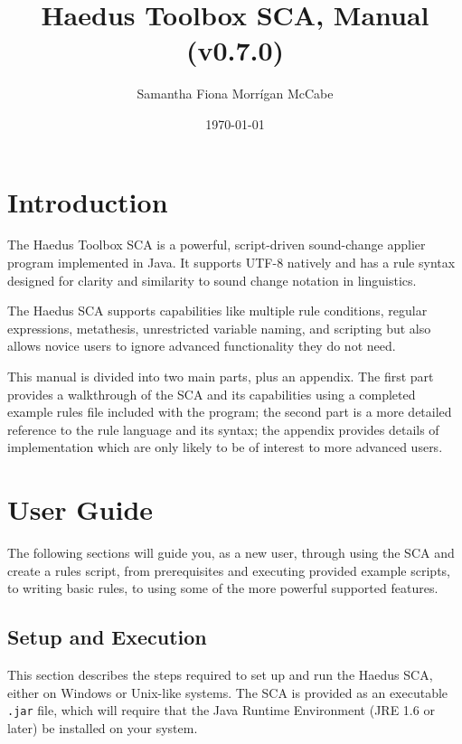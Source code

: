 \documentclass[10pt,letterpaper]{article}
\title{Haedus Toolbox SCA, Manual (v0.7.0)}
\author{Samantha Fiona Morrígan McCabe}
\date{\today}
\begin{document}
\maketitle
\tableofcontents

\section*{Introduction} 
\label{sec:introduction}
The Haedus Toolbox SCA is a powerful, script-driven sound-change applier program implemented in Java. It supports UTF-8 natively and has a rule syntax designed for clarity and similarity to sound change notation in linguistics.

The Haedus SCA supports capabilities like multiple rule conditions, regular expressions, metathesis, unrestricted variable naming, and scripting but also allows novice users to ignore advanced functionality they do not need.

This manual is divided into two main parts, plus an appendix. The first part provides a walkthrough of the SCA and its capabilities using a completed example rules file included with the program; the second part is a more detailed reference to the rule language and its syntax; the appendix provides details of implementation which are only likely to be of interest to more advanced users.


\section{User Guide} 
\label{sec:user_guide}
The following sections will guide you, as a new user, through using the SCA and create a rules script, from prerequisites and executing provided example scripts, to writing basic rules, to using some of the more powerful supported features.


\subsection{Setup and Execution}
\label{sub:setup_and_execution}
This section describes the steps required to set up and run the Haedus SCA, either on Windows or Unix-like systems. The SCA is provided as an executable \texttt{.jar} file, which will require that the Java Runtime Environment (JRE 1.6 or later) be installed on your system.
\end{document}
